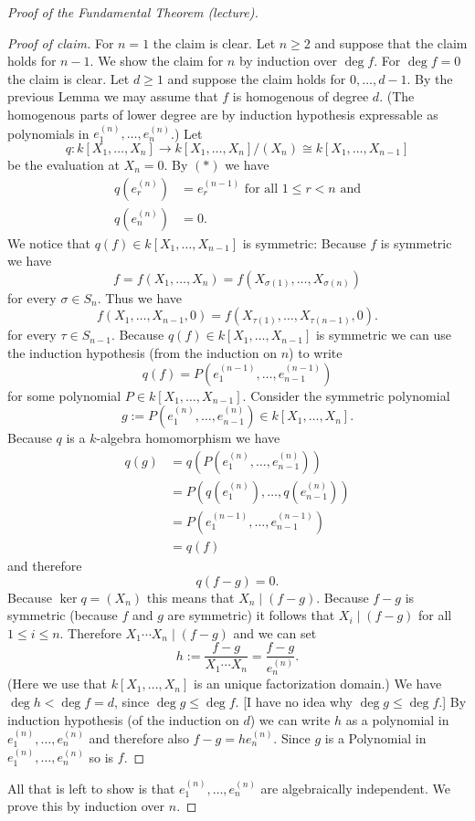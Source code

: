 \begin{proof}[Proof of the Fundamental Theorem (lecture)]
\begin{proof}[Proof of claim]
  For $n = 1$ the claim is clear. Let $n \geq 2$ and suppose that the claim holds for $n-1$. We show the claim for $n$ by induction over $\deg f$. For $\deg f = 0$ the claim is clear. Let $d \geq 1$ and suppose the claim holds for $0, \ldots, d-1$. By the previous Lemma we may assume that $f$ is homogenous of degree $d$. (The homogenous parts of lower degree are by induction hypothesis expressable as polynomials in $e^{(n)}_1, \ldots, e^{(n)}_n$.) Let
  \[
   q : k[X_1, \ldots, X_n] \to k[X_1, \ldots, X_n]/(X_n) \cong k[X_1, \ldots, X_{n-1}]
  \]
  be the evaluation at $X_n = 0$. By $(\ast)$ we have
  \begin{align*}
   q\left( e^{(n)}_r \right) &= e^{(n-1)}_r \text{ for all } 1 \leq r < n \text{ and}\\
   q\left( e^{(n)}_n \right) &= 0.
  \end{align*}
  We notice that $q(f) \in k[X_1, \ldots, X_{n-1}]$ is symmetric: Because $f$ is symmetric we have
  \[
   f = f(X_1, \ldots, X_n) = f(X_{\sigma(1)}, \ldots, X_{\sigma(n)})
  \]
  for every $\sigma \in S_n$. Thus we have
  \[
   f(X_1, \ldots, X_{n-1}, 0) = f(X_{\tau(1)}, \ldots, X_{\tau(n-1)}, 0).
  \]
  for every $\tau \in S_{n-1}$. Because $q(f) \in k[X_1, \ldots, X_{n-1}]$ is symmetric we can use the induction hypothesis (from the induction on $n$) to write
  \[
   q(f) = P\left(e^{(n-1)}_1, \ldots, e^{(n-1)}_{n-1}\right)
  \]
  for some polynomial $P \in k[X_1, \ldots, X_{n-1}]$. Consider the symmetric polynomial
  \[
   g := P\left(e^{(n)}_1, \ldots, e^{(n)}_{n-1}\right) \in k[X_1, \ldots, X_n].
  \]
  Because $q$ is a $k$-algebra homomorphism we have
  \begin{align*}
   q(g)
   &= q\left( P\left(e^{(n)}_1, \ldots, e^{(n)}_{n-1}\right) \right) \\
   &= P\left( q\left(e^{(n)}_1\right), \ldots, q\left(e^{(n)}_{n-1}\right) \right) \\
   &= P\left( e^{(n-1)}_1, \ldots, e^{(n-1)}_{n-1} \right) \\
   &= q(f)
  \end{align*}
  and therefore
  \[
   q(f-g) = 0.
  \]
  Because $\ker q = (X_n)$ this means that $X_n \mid (f-g)$. Because $f-g$ is symmetric (because $f$ and $g$ are symmetric) it follows that $X_i \mid (f-g)$ for all $1 \leq i \leq n$. Therefore $X_1 \cdots X_n \mid (f-g)$ and we can set
  \[
   h := \frac{f-g}{X_1 \cdots X_n} = \frac{f-g}{e^{(n)}_n}.
  \]
  (Here we use that $k[X_1, \ldots, X_n]$ is an unique factorization domain.) We have $\deg h < \deg f = d$, since $\deg g \leq \deg f$. [I have no idea why $\deg g \leq \deg f$.] By induction hypothesis (of the induction on $d$) we can write $h$ as a polynomial in $e^{(n)}_1, \ldots, e^{(n)}_n$ and therefore also $f-g = h e^{(n)}_n$. Since $g$ is a Polynomial in $e^{(n)}_1, \ldots, e^{(n)}_n$ so is $f$.
 \end{proof}
  All that is left to show is that $e^{(n)}_1, \ldots, e^{(n)}_n$ are algebraically independent. We prove this by induction over $n$.
  

\end{proof}
